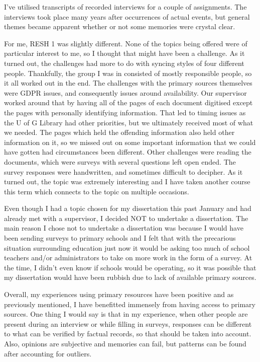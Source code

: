 \documentclass{l4proj}
\begin{document}
\begin{appendices}
I've utilised transcripts of recorded interviews for a couple of assignments. The interviews took place many years after occurrences of actual events, but general themes became apparent whether or not some memories were crystal clear.

For me, RESH 1 was slightly different. None of the topics being offered were of particular interest to me, so I thought that might have been a challenge. As it turned out, the challenges had more to do with syncing styles of four different people. Thankfully, the group I was in consisted of mostly responsible people, so it all worked out in the end. The challenges with the primary sources themselves were GDPR issues, and consequently issues around availability. Our supervisor worked around that by having all of the pages of each document digitised except the pages with personally identifying information. That led to timing issues as the U of G Library had other priorities, but we ultimately received most of what we needed. The pages which held the offending information also held other information on it, so we missed out on some important information that we could have gotten had circumstances been different. Other challenges were reading the documents, which were surveys with several questions left open ended. The survey responses were handwritten, and sometimes difficult to decipher. As it turned out, the topic was extremely interesting and I have taken another course this term which connects to the topic on multiple occasions.

Even though I had a topic chosen for my dissertation this past January and had already met with a supervisor, I decided NOT to undertake a dissertation. The main reason I chose not to undertake a dissertation was because I would have been sending surveys to primary schools and I felt that with the precarious situation surrounding education just now it would be asking too much of school teachers and/or administrators to take on more work in the form of a survey. At the time, I didn't even know if schools would be operating, so it was possible that my dissertation would have been rubbish due to lack of available primary sources.

Overall, my experiences using primary resources have been positive and as previously mentioned, I have benefitted immensely from having access to primary sources. One thing I would say is that in my experience, when other people are present during an interview or while filling in surveys, responses can be different to what can be verified by factual records, so that should be taken into account. Also, opinions are subjective and memories can fail, but patterns can be found after accounting for outliers.


\end{appendices}
\end{document}
